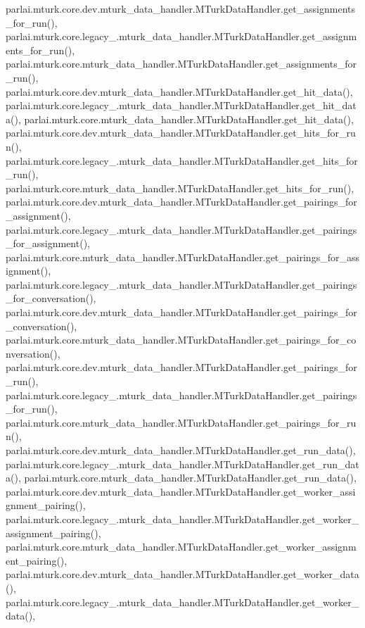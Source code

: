 parlai.\+mturk.\+core.\+dev.\+mturk\+\_\+data\+\_\+handler.\+M\+Turk\+Data\+Handler.\+get\+\_\+assignments\+\_\+for\+\_\+run(), parlai.\+mturk.\+core.\+legacy\+\_.\+mturk\+\_\+data\+\_\+handler.\+M\+Turk\+Data\+Handler.\+get\+\_\+assignments\+\_\+for\+\_\+run(), parlai.\+mturk.\+core.\+mturk\+\_\+data\+\_\+handler.\+M\+Turk\+Data\+Handler.\+get\+\_\+assignments\+\_\+for\+\_\+run(), parlai.\+mturk.\+core.\+dev.\+mturk\+\_\+data\+\_\+handler.\+M\+Turk\+Data\+Handler.\+get\+\_\+hit\+\_\+data(), parlai.\+mturk.\+core.\+legacy\+\_.\+mturk\+\_\+data\+\_\+handler.\+M\+Turk\+Data\+Handler.\+get\+\_\+hit\+\_\+data(), parlai.\+mturk.\+core.\+mturk\+\_\+data\+\_\+handler.\+M\+Turk\+Data\+Handler.\+get\+\_\+hit\+\_\+data(), parlai.\+mturk.\+core.\+dev.\+mturk\+\_\+data\+\_\+handler.\+M\+Turk\+Data\+Handler.\+get\+\_\+hits\+\_\+for\+\_\+run(), parlai.\+mturk.\+core.\+legacy\+\_.\+mturk\+\_\+data\+\_\+handler.\+M\+Turk\+Data\+Handler.\+get\+\_\+hits\+\_\+for\+\_\+run(), parlai.\+mturk.\+core.\+mturk\+\_\+data\+\_\+handler.\+M\+Turk\+Data\+Handler.\+get\+\_\+hits\+\_\+for\+\_\+run(), parlai.\+mturk.\+core.\+dev.\+mturk\+\_\+data\+\_\+handler.\+M\+Turk\+Data\+Handler.\+get\+\_\+pairings\+\_\+for\+\_\+assignment(), parlai.\+mturk.\+core.\+legacy\+\_.\+mturk\+\_\+data\+\_\+handler.\+M\+Turk\+Data\+Handler.\+get\+\_\+pairings\+\_\+for\+\_\+assignment(), parlai.\+mturk.\+core.\+mturk\+\_\+data\+\_\+handler.\+M\+Turk\+Data\+Handler.\+get\+\_\+pairings\+\_\+for\+\_\+assignment(), parlai.\+mturk.\+core.\+legacy\+\_.\+mturk\+\_\+data\+\_\+handler.\+M\+Turk\+Data\+Handler.\+get\+\_\+pairings\+\_\+for\+\_\+conversation(), parlai.\+mturk.\+core.\+dev.\+mturk\+\_\+data\+\_\+handler.\+M\+Turk\+Data\+Handler.\+get\+\_\+pairings\+\_\+for\+\_\+conversation(), parlai.\+mturk.\+core.\+mturk\+\_\+data\+\_\+handler.\+M\+Turk\+Data\+Handler.\+get\+\_\+pairings\+\_\+for\+\_\+conversation(), parlai.\+mturk.\+core.\+dev.\+mturk\+\_\+data\+\_\+handler.\+M\+Turk\+Data\+Handler.\+get\+\_\+pairings\+\_\+for\+\_\+run(), parlai.\+mturk.\+core.\+legacy\+\_.\+mturk\+\_\+data\+\_\+handler.\+M\+Turk\+Data\+Handler.\+get\+\_\+pairings\+\_\+for\+\_\+run(), parlai.\+mturk.\+core.\+mturk\+\_\+data\+\_\+handler.\+M\+Turk\+Data\+Handler.\+get\+\_\+pairings\+\_\+for\+\_\+run(), parlai.\+mturk.\+core.\+dev.\+mturk\+\_\+data\+\_\+handler.\+M\+Turk\+Data\+Handler.\+get\+\_\+run\+\_\+data(), parlai.\+mturk.\+core.\+legacy\+\_.\+mturk\+\_\+data\+\_\+handler.\+M\+Turk\+Data\+Handler.\+get\+\_\+run\+\_\+data(), parlai.\+mturk.\+core.\+mturk\+\_\+data\+\_\+handler.\+M\+Turk\+Data\+Handler.\+get\+\_\+run\+\_\+data(), parlai.\+mturk.\+core.\+dev.\+mturk\+\_\+data\+\_\+handler.\+M\+Turk\+Data\+Handler.\+get\+\_\+worker\+\_\+assignment\+\_\+pairing(), parlai.\+mturk.\+core.\+legacy\+\_.\+mturk\+\_\+data\+\_\+handler.\+M\+Turk\+Data\+Handler.\+get\+\_\+worker\+\_\+assignment\+\_\+pairing(), parlai.\+mturk.\+core.\+mturk\+\_\+data\+\_\+handler.\+M\+Turk\+Data\+Handler.\+get\+\_\+worker\+\_\+assignment\+\_\+pairing(), parlai.\+mturk.\+core.\+dev.\+mturk\+\_\+data\+\_\+handler.\+M\+Turk\+Data\+Handler.\+get\+\_\+worker\+\_\+data(), parlai.\+mturk.\+core.\+legacy\+\_.\+mturk\+\_\+data\+\_\+handler.\+M\+Turk\+Data\+Handler.\+get\+\_\+worker\+\_\+data(), 